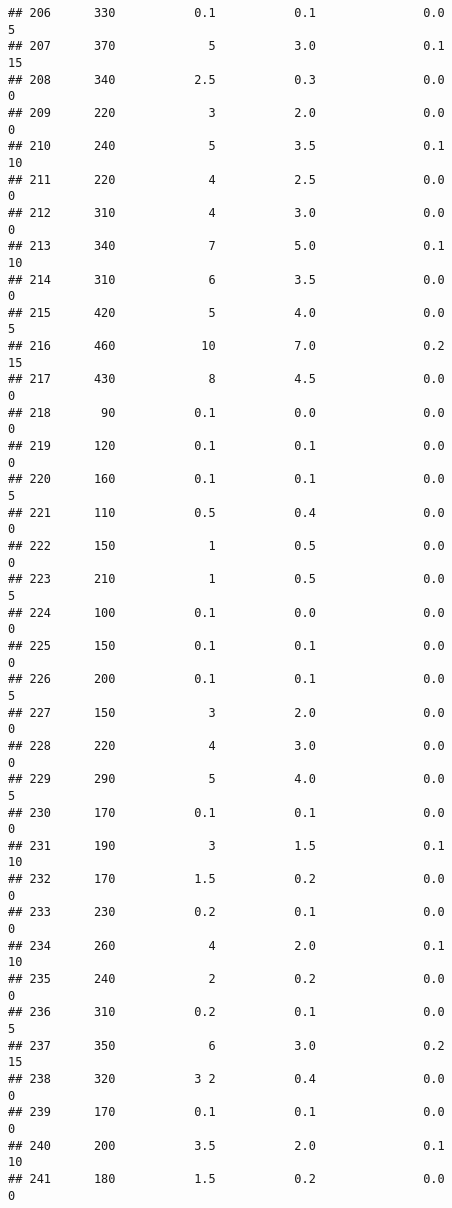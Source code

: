 \documentclass[
]{article}
\begin{document}
\begin{verbatim}
## 206      330           0.1           0.1               0.0           5
## 207      370             5           3.0               0.1          15
## 208      340           2.5           0.3               0.0           0
## 209      220             3           2.0               0.0           0
## 210      240             5           3.5               0.1          10
## 211      220             4           2.5               0.0           0
## 212      310             4           3.0               0.0           0
## 213      340             7           5.0               0.1          10
## 214      310             6           3.5               0.0           0
## 215      420             5           4.0               0.0           5
## 216      460            10           7.0               0.2          15
## 217      430             8           4.5               0.0           0
## 218       90           0.1           0.0               0.0           0
## 219      120           0.1           0.1               0.0           0
## 220      160           0.1           0.1               0.0           5
## 221      110           0.5           0.4               0.0           0
## 222      150             1           0.5               0.0           0
## 223      210             1           0.5               0.0           5
## 224      100           0.1           0.0               0.0           0
## 225      150           0.1           0.1               0.0           0
## 226      200           0.1           0.1               0.0           5
## 227      150             3           2.0               0.0           0
## 228      220             4           3.0               0.0           0
## 229      290             5           4.0               0.0           5
## 230      170           0.1           0.1               0.0           0
## 231      190             3           1.5               0.1          10
## 232      170           1.5           0.2               0.0           0
## 233      230           0.2           0.1               0.0           0
## 234      260             4           2.0               0.1          10
## 235      240             2           0.2               0.0           0
## 236      310           0.2           0.1               0.0           5
## 237      350             6           3.0               0.2          15
## 238      320           3 2           0.4               0.0           0
## 239      170           0.1           0.1               0.0           0
## 240      200           3.5           2.0               0.1          10
## 241      180           1.5           0.2               0.0           0

\end{verbatim}
\end{document}
